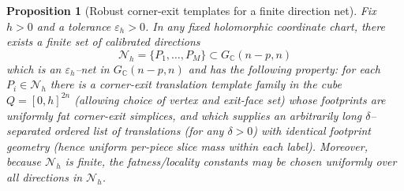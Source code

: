 \documentclass[11pt]{article}
\numberwithin{equation}{section}  %
\theoremstyle{plain}
\newtheorem{proposition}[theorem]{Proposition}
\theoremstyle{definition}
\theoremstyle{remark}
\newcommand{\C}{\mathbb{C}}
\begin{document}
\begin{proposition}[Robust corner-exit templates for a finite direction net]\label{prop:corner-exit-template-net}
Fix $h>0$ and a tolerance $\varepsilon_h>0$.
In any fixed holomorphic coordinate chart, there exists a finite set of calibrated directions
\[
\mathcal N_h=\{P_1,\dots,P_M\}\subset G_\C(n-p,n)
\]
which is an $\varepsilon_h$--net in $G_\C(n-p,n)$ and has the following property:
for each $P_i\in\mathcal N_h$ there is a corner-exit translation template family in the cube $Q=[0,h]^{2n}$ (allowing choice of vertex and exit-face set)
whose footprints are uniformly fat corner-exit simplices, and which supplies an arbitrarily long $\delta$--separated ordered list of translations (for any $\delta>0$)
with identical footprint geometry (hence uniform per-piece slice mass within each label).
Moreover, because $\mathcal N_h$ is finite, the fatness/locality constants may be chosen \emph{uniformly} over all directions in $\mathcal N_h$.
\end{proposition}
\end{document}
